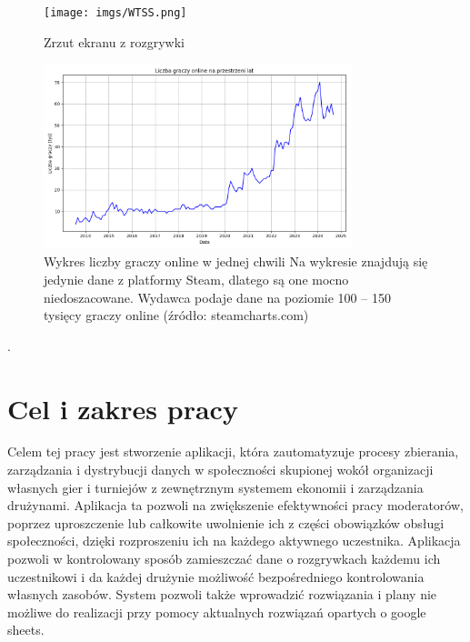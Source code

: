     \begin{figure}
        \centering
        \texttt{[image: imgs/WTSS.png]}
        \caption{Zrzut ekranu z rozgrywki}
    \end{figure}

    \begin{figure}
        \centering
        \includegraphics[width=0.8\textwidth]{imgs/wykres_graczy.png}
        \caption{Wykres liczby graczy online w jednej chwili
            Na wykresie znajdują się jedynie dane z platformy Steam, dlatego są one mocno niedoszacowane. Wydawca podaje dane na poziomie 100 – 150 tysięcy graczy online
            (źródło: steamcharts.com)}
    \end{figure}

.

    \newpage


    \section{Cel i zakres pracy }
    \label{sec:celePracy}

    	Celem tej pracy jest stworzenie aplikacji, która zautomatyzuje procesy zbierania, zarządzania i dystrybucji danych w społeczności skupionej wokół organizacji własnych gier i turniejów z zewnętrznym systemem ekonomii i zarządzania drużynami. Aplikacja ta pozwoli na zwiększenie efektywności pracy moderatorów, poprzez uproszczenie lub całkowite uwolnienie ich z części obowiązków obsługi społeczności, dzięki rozproszeniu ich na każdego aktywnego uczestnika. Aplikacja pozwoli w kontrolowany sposób zamieszczać dane o rozgrywkach każdemu ich uczestnikowi i da każdej drużynie możliwość bezpośredniego kontrolowania własnych zasobów. System pozwoli także wprowadzić rozwiązania i plany nie możliwe do realizacji przy pomocy aktualnych rozwiązań opartych o google sheets.\\

